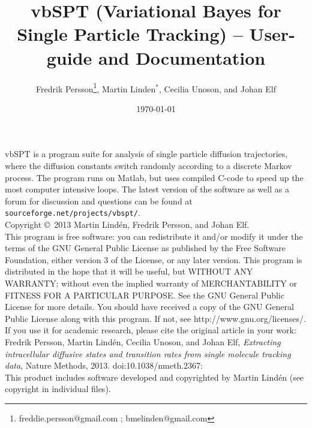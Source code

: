 \documentclass[11pt,a4paper]{article}
\title{vbSPT (Variational Bayes for Single Particle Tracking) -- User-guide and Documentation}
\author{Fredrik Persson\footnote{freddie.persson@gmail.com ; bmelinden@gmail.com},
Martin Linden$^*$, Cecilia Unoson, and Johan Elf}
\date{\today}
\begin{document}
\maketitle 

\noindent vbSPT is a program suite for analysis of single particle diffusion
trajectories, where the diffusion constants switch randomly according
to a discrete Markov process. The program runs on Matlab, but uses
compiled C-code to speed up the most computer intensive loops.  The
latest version of the software as well as a forum for discussion and
questions can be found at \verb+sourceforge.net/projects/vbspt/+.\medskip\\

\noindent Copyright \copyright \  2013 Martin Lind\'en, Fredrik Persson, and
Johan Elf.\medskip\\
 
\noindent This program is free software: you can redistribute it
and/or modify it under the terms of the GNU General Public License as
published by the Free Software Foundation, either version 3 of the
License, or any later version.  This program is distributed in the
hope that it will be useful, but WITHOUT ANY WARRANTY; without even
the implied warranty of MERCHANTABILITY or FITNESS FOR A PARTICULAR
PURPOSE. See the GNU General Public License for more details. You
should have received a copy of the GNU General Public License along
with this program. If not, see http://www.gnu.org/licenses/.\medskip\\

\noindent If you use it for academic research, please cite the
original article in your work:\medskip\\
\noindent Fredrik Persson, Martin Lind\'en, Cecilia Unoson, and Johan
Elf, \emph{Extracting intracellular diffusive states and transition
  rates from single molecule tracking data}, Nature Methods,
2013. doi:10.1038/nmeth.2367: \medskip\\


\noindent  This product includes software developed and copyrighted by Martin
Lind\'en (see copyright in individual files). 
\end{document}
